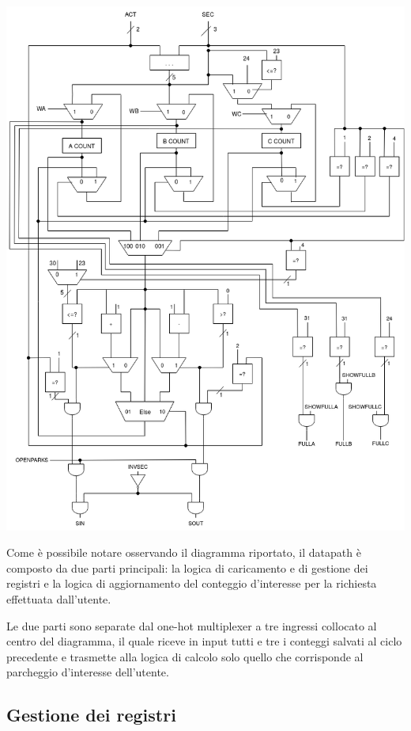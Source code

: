 \documentclass[
  12pt,
  a4paper,
  headings=optiontoheadandtoc
]{scrreprt}
\begin{document}
\Centering
\includegraphics[scale=0.5]{datapath}

\RaggedRight

Come è possibile notare osservando il diagramma riportato, il datapath è composto da due parti principali: la logica di caricamento e di gestione dei registri e la logica di aggiornamento del conteggio d'interesse per la richiesta effettuata dall'utente.

Le due parti sono separate dal one-hot multiplexer a tre ingressi collocato al centro del diagramma, il quale riceve in input tutti e tre i conteggi salvati al ciclo precedente e trasmette alla logica di calcolo solo quello che corrisponde al parcheggio d'interesse dell'utente.

\subsection[nonumber=true]{Gestione dei registri}
\end{document}
